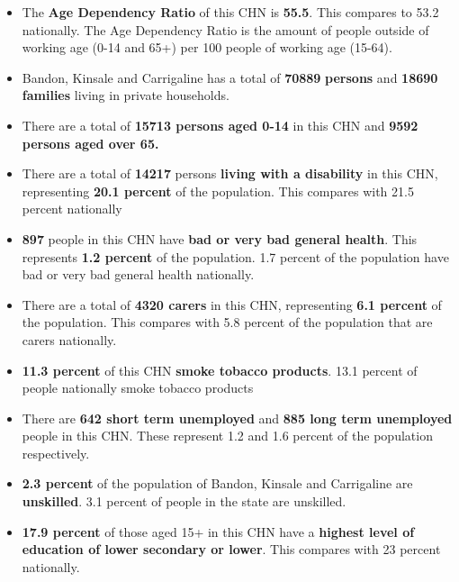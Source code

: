 \documentclass{article}
\begin{document}
\begin{itemize}

\item The \textbf{Age Dependency Ratio} of this CHN is  \textbf{55.5}. This compares to 53.2 nationally. The Age Dependency Ratio is the amount of people outside of working age (0-14 and 65+) per 100 people of working age (15-64). 

\item Bandon, Kinsale and Carrigaline has a total of \textbf{\num{70889}} \textbf{persons} and  \textbf{\num{18690}} \textbf{families} living in private households.

\item There are a total of \textbf{\num{15713} persons aged 0-14} in this CHN and \textbf{\num{9592} persons aged over 65.} 

\item There are a total of \textbf{\num{14217}} persons \textbf{living with a disability} in this CHN, representing \textbf{20.1 percent} of the population. This compares with  21.5 percent nationally

\item \textbf{\num{897}} people in this CHN have \textbf{bad or very bad general health}. This represents \textbf{1.2 percent} of the population. 1.7 percent of the population have bad or very bad general health nationally. 

\item There are a total of \textbf{\num{4320} carers} in this CHN, representing \textbf{6.1 percent} of the population. This compares with 5.8 percent of the population that are carers nationally. 

\item \textbf{11.3 percent} of this CHN \textbf{smoke tobacco products}. 13.1 percent of people nationally smoke tobacco products

\item There are \textbf{\num{642} short term unemployed} and \textbf{\num{885} long term unemployed} people in this CHN. These represent 1.2 and 1.6 percent of the population respectively.

\item  \textbf{2.3 percent} of the population of Bandon, Kinsale and Carrigaline are \textbf{unskilled}. 3.1 percent of people in the state are unskilled.

\item \textbf{17.9 percent} of those aged 15+ in this CHN have a \textbf{highest level of education of lower secondary or lower}. This compares with 23 percent nationally. 


\end{itemize}
\end{document}
